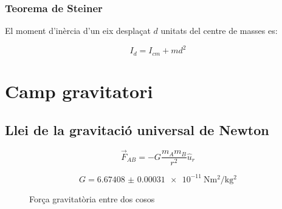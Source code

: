 \subsubsection{Teorema de Steiner}
\label{ssub:teorema_de_Steiner}

El moment d'inèrcia d'un eix desplaçat $d$ unitats del centre de masses es:

\begin{equation}
    I_d = I_{cm} + m d^2
\end{equation}

\section{Camp gravitatori}
\label{sec:camp_gravitatori}

\subsection{Llei de la gravitació universal de Newton}
\label{sub:llei_de_la_gravitacio_universal}

\begin{equation} \label{eq:gravitacio_universal}
    \vec{F}_{AB} = -G\frac{m_Am_B}{r^2} \hat{u}_r
\end{equation}

\begin{equation}\label{eq:constant_grav_universal}
    G = \SI{6.67408(31)e-11}{\newton\metre\squared\per\kilo\gram\squared}
\end{equation}

\begin{figure}[H]
    \centering
    \caption{Força gravitatòria entre dos cosos}
    \label{fig:forca_grav}
\end{figure}

\vspace{1cm}

